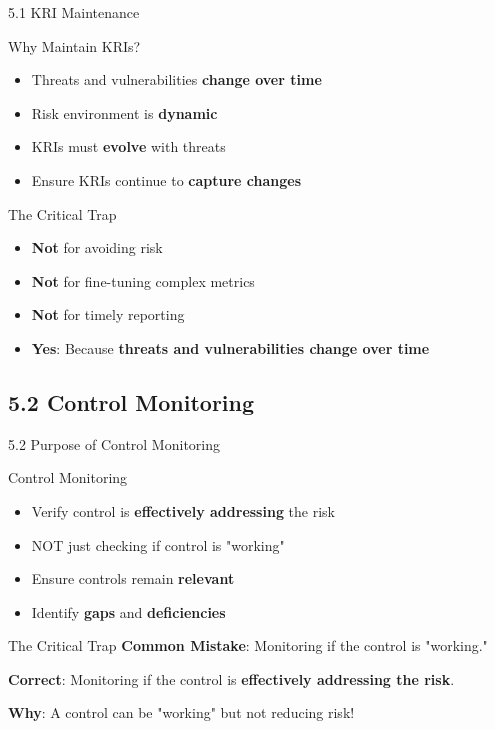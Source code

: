 \documentclass{beamer}
\begin{document}
	\begin{frame}{5.1 KRI Maintenance}
		\begin{block}{Why Maintain KRIs?}
			\begin{itemize}
				\item Threats and vulnerabilities \textbf{change over time}
				\item Risk environment is \textbf{dynamic}
				\item KRIs must \textbf{evolve} with threats
				\item Ensure KRIs continue to \textbf{capture changes}
			\end{itemize}
		\end{block}
		
		\begin{alertblock}{The Critical Trap}
			\begin{itemize}
				\item \textbf{Not} for avoiding risk
				\item \textbf{Not} for fine-tuning complex metrics
				\item \textbf{Not} for timely reporting
				\item \textbf{Yes}: Because \textbf{threats and vulnerabilities change over time}
			\end{itemize}
		\end{alertblock}
	\end{frame}
	
	\subsection{5.2 Control Monitoring}
	\begin{frame}{5.2 Purpose of Control Monitoring}
		\begin{block}{Control Monitoring}
			\begin{itemize}
				\item Verify control is \textbf{effectively addressing} the risk
				\item NOT just checking if control is "working"
				\item Ensure controls remain \textbf{relevant}
				\item Identify \textbf{gaps} and \textbf{deficiencies}
			\end{itemize}
		\end{block}
		
		\begin{alertblock}{The Critical Trap}
			\textbf{Common Mistake}: Monitoring if the control is "working."
			
			\textbf{Correct}: Monitoring if the control is \textbf{effectively addressing the risk}.
			
			\textbf{Why}: A control can be "working" but not reducing risk!
		\end{alertblock}
	\end{frame}
	
\end{document}
